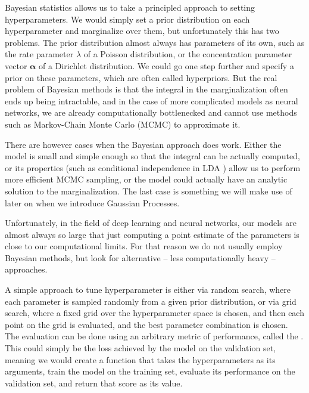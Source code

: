 Bayesian statistics allows us to take a principled approach to setting
hyperparameters. We would simply set a prior distribution on each
hyperparameter and marginalize over them, but unfortunately this has two
problems. The prior distribution almost always has parameters of its own, such
as the rate parameter $\lambda$ of a Poisson distribution, or the concentration parameter vector $\symbf{\alpha}$ of a Dirichlet distribution. We could go one step further and specify
a prior on these parameters, which are often called hyperpriors.  But the real
problem of Bayesian methods is that the integral in the marginalization often
ends up being intractable, and in the case of more complicated models as neural
networks, we are already computationally bottlenecked and cannot use methods
such as Markov-Chain Monte Carlo (MCMC) to approximate it.

There are however cases when the Bayesian approach does work. Either the model
is small and simple enough so that the integral can be actually computed, or
its properties (such as conditional independence in LDA
\citep{lda-blei2003latent}) allow us to perform more efficient MCMC sampling,
or the model could actually have an analytic solution to the marginalization.
The last case is something we will make use of later on when we introduce
Gaussian Processes.

Unfortunately, in the field of deep learning \citep{dlbook} and neural
networks, our models are almost always so large that just computing a point
estimate of the parameters is close to our computational limits. For that
reason we do not usually employ Bayesian methods, but look for alternative --
less computationally heavy -- approaches.

A simple approach to tune hyperparameter is either via random search, where
each parameter is sampled randomly from a given prior distribution, or via grid
search, where a fixed grid over the hyperparameter space is chosen, and then
each point on the grid is evaluated, and the best parameter combination is
chosen. The evaluation can be done using an arbitrary metric of performance,
called the . This could simply be the loss
achieved by the model on the validation set, meaning we would create a function that takes the hyperparameters as its arguments, train the model on the training set, evaluate its performance on the validation set, and return that score as its value.

